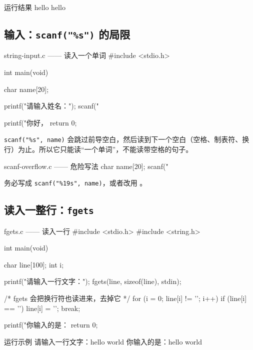 \begin{outbox}{运行结果}
hello
hello
\end{outbox}

\subsection{输入：\texttt{scanf("\%s")} 的局限}

\begin{codebox}{string-input.c —— 读入一个单词}
#include <stdio.h>

int main(void)
{
    char name[20];

    printf("请输入姓名：");
    scanf("%

    printf("你好，%
    return 0;
}
\end{codebox}

\texttt{scanf("\%s", name)} 会跳过前导空白，然后读到下一个空白（空格、制表符、换行）为止。所以它只能读“一个单词”，不能读带空格的句子。

\begin{pitfall}
\begin{codebox}{scanf-overflow.c —— 危险写法}
char name[20];
scanf("%
\end{codebox}
务必写成 \texttt{scanf("\%19s", name)}，或者改用 。
\end{pitfall}

\subsection{读入一整行：\texttt{fgets}}

\begin{codebox}{fgets.c —— 读入一行}
#include <stdio.h>
#include <string.h>

int main(void)
{
    char line[100];
    int i;

    printf("请输入一行文字：");
    fgets(line, sizeof(line), stdin);

    /* fgets 会把换行符也读进来，去掉它 */
    for (i = 0; line[i] != '\0'; i++) {
        if (line[i] == '\n') {
            line[i] = '\0';
            break;
        }
    }

    printf("你输入的是：%
    return 0;
}
\end{codebox}

\begin{outbox}{运行示例}
请输入一行文字：hello world
你输入的是：hello world
\end{outbox}

